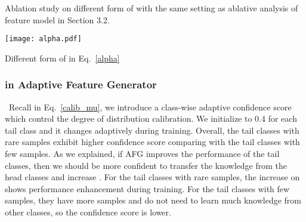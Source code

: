 \documentclass[runningheads]{llncs}
\begin{document}
\begin{minipage}{\textwidth}
  \centering
 \begin{minipage}{0.4\textwidth}
  \centering
    \makeatletter{}\makeatother\caption{Ablation study on different form of  with the same setting as ablative analysis of feature model in Section 3.2.  }
    \vspace{3mm}
    \label{table:alpha ablation}
  \end{minipage}
  \hspace{1mm}
  \begin{minipage}[h]{0.4\textwidth}
    \texttt{[image: alpha.pdf]}
    \makeatletter\def\@captype{figure}\makeatother\caption{Different form of  in Eq.~\ref{alpha}}
    \label{fig:alpha}
  \end{minipage}
\end{minipage}

\subsubsection{ in Adaptive Feature Generator} \ Recall in Eq.~\ref{calib_mu}, we introduce a class-wise adaptive confidence score  which control the degree of distribution calibration. We initialize  to 0.4 for each tail class and it changes  adaptively during training. Overall, the tail classes with rare samples exhibit higher confidence score comparing with the tail classes with few samples. As we explained, if AFG improves the performance of the tail classes, then we should be more confident to transfer the knowledge from the head classes and increase . For the tail classes with rare samples, the increase on  shows performance enhancement during training. For the tail classes with few samples, they have more samples and do not need to learn much knowledge from other classes, so the confidence score is lower.
\end{document}
